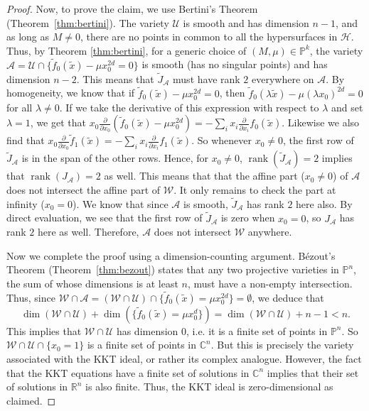 \documentclass[aps,pra,notitlepage,preprintnumbers,11pt,tightenlines]{revtex4-1}
\renewcommand{\AA}{\mathcal{A}}
\newcommand{\CC}{\mathbb{C}}
\newcommand{\bbR}{\mathbb{R}}
\newcommand{\HH}{\mathcal{H}}
\newcommand{\PP}{\mathbb{P}}
\newcommand{\UU}{\mathcal{U}}
\newcommand{\WW}{\mathcal{W}}
\newcommand{\pd}{\partial}
\DeclareMathOperator{\rank}{rank}
\begin{document}
\begin{proof}
Now, to prove the claim, we use Bertini's Theorem (Theorem~\ref{thm:bertini}). The variety $\UU$
is smooth and has dimension $n - 1$, and as long as $M\neq 0$, there are no points in common to all the
hypersurfaces in $\HH$. Thus, by Theorem \ref{thm:bertini}, for a
generic choice of $(M, \mu) \in \PP^k$, the
variety $\AA = \UU \cap \{ \tilde{f}_0(\tilde{x}) - \mu x_0^{2d} = 0 \}$ is
smooth (has no singular points) and has dimension $n-2$. 
This means that $\tilde{J}_\AA$ must have
rank $2$ everywhere on $\AA$. By homogeneity, we know that if
$\tilde{f}_0(\tilde{x}) - \mu x_0^{2d} = 0$, then
$\tilde{f}_0(\lambda \tilde{x})  - \mu (\lambda x_0)^{2d} = 0$ for all $\lambda \neq
0$. If we take the derivative of this expression with respect to
$\lambda$ and set $\lambda=1$, we get that $x_0 \frac{\pd}{\pd x_0} (\tilde{f}_0(\tilde{x}) -\mu x_0^{2d})= -\sum_i
x_i \frac{\pd}{\pd x_i} f_0(\tilde{x})$. Likewise we also find that $x_0 \frac{\pd}{\pd x_0} \tilde{f}_1(\tilde{x}) = -\sum_i
x_i \frac{\pd}{\pd x_i} f_1(\tilde{x})$. So whenever $x_0 \neq 0$, the first row
of $\tilde{J}_\AA$ is in the span of the other rows. 
Hence, for $x_0
\neq 0$, $\rank(\tilde{J}_\AA) = 2$ implies that $\rank(J_\AA) =2$ as
well. This means that that the affine part ($x_0 \neq 0$) of $\AA$ does not
intersect the affine part of $\WW$. It only remains to check the
part at infinity ($x_0 = 0$). We know that since $\AA$ is smooth,
$\tilde{J}_\AA$ has rank $2$ here also. By direct evaluation, we see that
the first row of $\tilde{J}_\AA$ is zero when $x_0 = 0$, so $J_\AA$
has rank $2$ here as well. Therefore, $\AA$ does not intersect $\WW$ anywhere.

Now we complete the proof using a dimension-counting
argument. B\'{e}zout's Theorem (Theorem~\ref{thm:bezout}) states that any two projective
varieties in $\PP^n$, the sum of whose dimensions is at least $n$,
must have a non-empty intersection. Thus, since $\WW \cap \AA = (\WW \cap \UU) \cap \{
\tilde{f}_0(\tilde{x}) = \mu x_0^{2d}\} = \emptyset$, we deduce that
\[ \dim(\WW \cap \UU) + \dim(\{
\tilde{f}_0(\tilde{x}) = \mu x_0^d\}) = \dim(\WW \cap \UU) + n - 1 <
n. \]
This implies that $\WW \cap \UU$ has dimension $0$, i.e. it is a
finite set of points in $\PP^n$. So $\WW \cap \UU \cap \{x_0 = 1\}$ is
a finite set of points in $\CC^n$. But this is precisely the variety
associated with the KKT ideal, or rather its complex
analogue. However, the fact that the KKT equations have a finite set
of solutions in $\CC^n$ implies that their set of solutions in
$\bbR^n$ is also finite.  Thus, the KKT ideal is zero-dimensional
as claimed.
 \end{proof}
\end{document}
